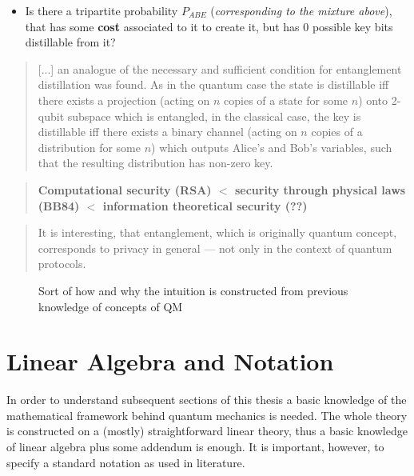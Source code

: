 	 \begin{itemize}
		\item Is there a tripartite probability $P_{ABE}$ (\textsl{corresponding to the mixture above}), that has some \textbf{cost} associated to it to create it, but has $0$ possible key bits distillable from it? 
	 \end{itemize}
	 
	
			\begin{quotation}
				[...] an analogue of the necessary and sufficient condition for entanglement distillation was found.
				As in the quantum case the state is distillable iff there exists a projection (acting on $n$ copies of a state for some $n$) onto 2-qubit subspace which is entangled, 
				in the classical case, the key is distillable iff there exists a binary channel (acting on $n$ copies of a distribution for some $n$) which outputs Alice's and Bob's variables, such that the resulting distribution has non-zero key.
				\cite{4H07}
			\end{quotation}
	
	
	\begin{quote}
	\textbf{Computational security (RSA) $<$ security through physical laws (BB84) $<$ information theoretical security (??)}
	\end{quote}
	
	\begin{quotation}
	It is interesting, that entanglement, which is originally quantum concept, corresponds to privacy in general --- not only in the context of quantum protocols.
	\cite{4H07}
	\end{quotation}
	
	\begin{figure}[H]
		\centering
		
		\caption{Sort of how and why the intuition is constructed from previous knowledge of concepts of QM}
	\end{figure}
	
	
	\section{Linear Algebra and Notation}
	In order to understand subsequent sections of this thesis %
		a basic knowledge of the mathematical framework behind quantum mechanics is needed. The whole theory is constructed on a (mostly) straightforward linear theory, thus a basic knowledge of linear algebra plus some addendum is enough. It is important, however, to specify a standard notation as used in literature.
	

